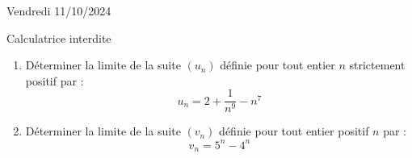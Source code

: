 \documentclass[a4paper,11pt,eval]{nsi}
\begin{document}
\textcolor{UGLiBlue}{Vendredi 11/10/2024}\\
\maketitle
\begin{center}
	Calculatrice interdite
\end{center}



\begin{enumerate}
    \item Déterminer la limite de la suite $(u_n)$ définie pour tout entier  $n$ strictement positif par : $$u_n=2+\dfrac{1}{n^9}-n^7$$
	\item Déterminer la limite de la suite $(v_n)$ définie pour tout entier positif $n$ par : $$v_n=5^n-4^n$$
\end{enumerate}
\end{document}
